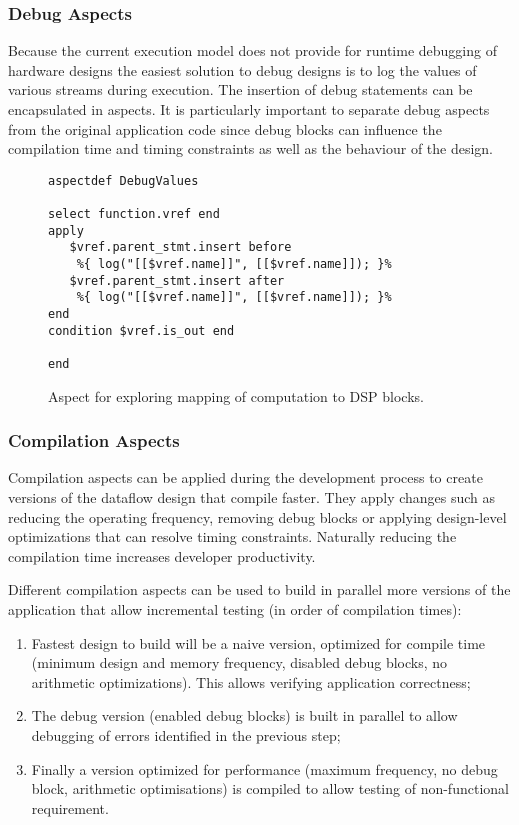 \lstset{style=MaxC}


\subsubsection{Debug Aspects}

Because the current execution model does not provide for runtime
debugging of hardware designs the easiest solution to debug designs is
to log the values of various streams during execution. The insertion
of debug statements can be encapsulated in aspects. It is particularly
important to separate debug aspects from the original application code
since debug blocks can influence the compilation time and timing
constraints as well as the behaviour of the design.

\lstset{style=lara}
\begin{figure}[!h]
  \centering
\begin{lstlisting}
aspectdef DebugValues
    
select function.vref end
apply
   $vref.parent_stmt.insert before 
    %{ log("[[$vref.name]]", [[$vref.name]]); }%
   $vref.parent_stmt.insert after 
    %{ log("[[$vref.name]]", [[$vref.name]]); }%
end
condition $vref.is_out end

end
\end{lstlisting}
  \caption{Aspect for exploring mapping of computation to DSP blocks.}
  \label{fig:aspect-DSP}
\end{figure}

\subsubsection{Compilation Aspects}

Compilation aspects can be applied during the development process to
create versions of the dataflow design that compile faster. They apply
changes such as reducing the operating frequency, removing debug
blocks or applying design-level optimizations that can resolve timing
constraints. Naturally reducing the compilation time increases
developer productivity.

Different compilation aspects can be used to build in parallel more
versions of the application that allow incremental testing (in order
of compilation times):
\begin{enumerate}
\item Fastest design to build will be a naive version, optimized for
  compile time (minimum design and memory frequency, disabled debug
  blocks, no arithmetic optimizations). This allows verifying
  application correctness;
\item The debug version (enabled debug blocks) is built in parallel to
  allow debugging of errors identified in the previous step;
\item Finally a version optimized for performance (maximum frequency,
  no debug block, arithmetic optimisations) is compiled to allow
  testing of non-functional requirement.
\end{enumerate}
